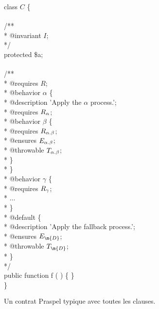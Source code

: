 \begin{figure}
\begin{bigpre}
class \(C\) \{ \\
\\
    /** \\
     * @invariant \(I\); \\
     */ \\
    protected \$a; \\
\\
    /** \\
     * @requires \(R\); \\
     * @behavior \(\alpha\) \{ \\
     *     @description 'Apply the \(\alpha\) process.'; \\
     *     @requires \(R\sb{\alpha}\); \\
     *     @behavior \(\beta\) \{ \\
     *         @requires  \(R\sb{\alpha.\beta}\); \\
     *         @ensures   \(E\sb{\alpha.\beta}\); \\
     *         @throwable \(T\sb{\alpha.\beta}\); \\
     *     \} \\
     * \} \\
     * @behavior \(\gamma\) \{ \\
     *     @requires \(R\sb{\gamma}\); \\
     *     \(\dots\) \\
     * \} \\
     * @default \{ \\
     *     @description 'Apply the fallback process.'; \\
     *     @ensures   \(E\sb{\m{D}}\); \\
     *     @throwable \(T\sb{\m{D}}\); \\
     * \} \\
     */ \\
    public function f ( ) \{ \} \\
\}
\end{bigpre}

\caption{\label{figure:language:typical_contract} Un contrat Praspel typique
avec toutes les clauses.}

\end{figure}


